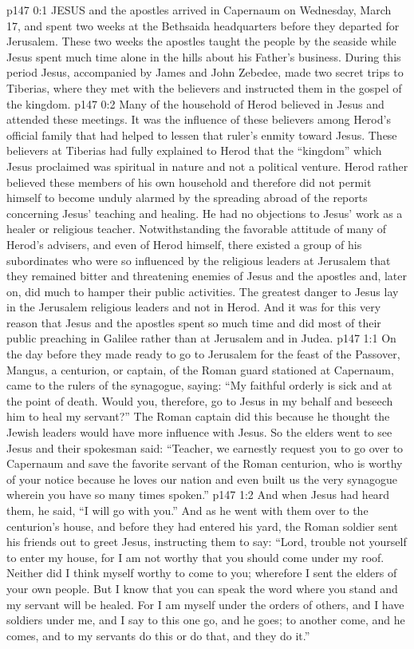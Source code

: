 \vs p147 0:1 JESUS and the apostles arrived in Capernaum on Wednesday, March 17, and spent two weeks at the Bethsaida headquarters before they departed for Jerusalem. These two weeks the apostles taught the people by the seaside while Jesus spent much time alone in the hills about his Father’s business. During this period Jesus, accompanied by James and John Zebedee, made two secret trips to Tiberias, where they met with the believers and instructed them in the gospel of the kingdom.
\vs p147 0:2 Many of the household of Herod believed in Jesus and attended these meetings. It was the influence of these believers among Herod’s official family that had helped to lessen that ruler’s enmity toward Jesus. These believers at Tiberias had fully explained to Herod that the “kingdom” which Jesus proclaimed was spiritual in nature and not a political venture. Herod rather believed these members of his own household and therefore did not permit himself to become unduly alarmed by the spreading abroad of the reports concerning Jesus’ teaching and healing. He had no objections to Jesus’ work as a healer or religious teacher. Notwithstanding the favorable attitude of many of Herod’s advisers, and even of Herod himself, there existed a group of his subordinates who were so influenced by the religious leaders at Jerusalem that they remained bitter and threatening enemies of Jesus and the apostles and, later on, did much to hamper their public activities. The greatest danger to Jesus lay in the Jerusalem religious leaders and not in Herod. And it was for this very reason that Jesus and the apostles spent so much time and did most of their public preaching in Galilee rather than at Jerusalem and in Judea.
\vs p147 1:1 On the day before they made ready to go to Jerusalem for the feast of the Passover, Mangus, a centurion, or captain, of the Roman guard stationed at Capernaum, came to the rulers of the synagogue, saying: “My faithful orderly is sick and at the point of death. Would you, therefore, go to Jesus in my behalf and beseech him to heal my servant?” The Roman captain did this because he thought the Jewish leaders would have more influence with Jesus. So the elders went to see Jesus and their spokesman said: “Teacher, we earnestly request you to go over to Capernaum and save the favorite servant of the Roman centurion, who is worthy of your notice because he loves our nation and even built us the very synagogue wherein you have so many times spoken.”
\vs p147 1:2 And when Jesus had heard them, he said, \textcolor{ubdarkred}{“I will go with you.”} And as he went with them over to the centurion’s house, and before they had entered his yard, the Roman soldier sent his friends out to greet Jesus, instructing them to say: “Lord, trouble not yourself to enter my house, for I am not worthy that you should come under my roof. Neither did I think myself worthy to come to you; wherefore I sent the elders of your own people. But I know that you can speak the word where you stand and my servant will be healed. For I am myself under the orders of others, and I have soldiers under me, and I say to this one go, and he goes; to another come, and he comes, and to my servants do this or do that, and they do it.”
